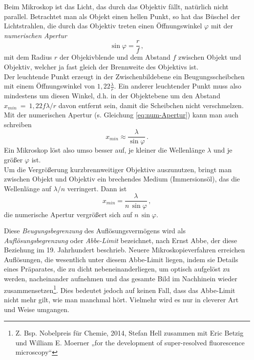 Beim Mikroskop ist das Licht, das durch das Objektiv fällt, natürlich nicht parallel. Betrachtet man als Objekt einen hellen Punkt, so hat das Büschel der Lichtstrahlen, die durch das Objektiv treten einen Öffnungswinkel $\varphi$ mit der \textit{numerischen Apertur}
\begin{equation} \label{eq:num-Apertur}
	\sin\varphi = \frac{r}{f}\, ,
\end{equation} 
mit dem Radius $r$ der Objekivblende und dem Abstand $f$ zwischen Objekt und Objektiv, welcher ja fast gleich der Brennweite des Objektivs ist.\\
Der leuchtende Punkt erzeugt in der Zwischenbildebene ein Beugungsscheibchen mit einem Öffnungswinkel von $1,22\frac{\lambda}{r}$. Ein anderer leuchtender Punkt muss also mindestens um diesen Winkel, d.h. in der Objektebene um den Abstand $x_{min}~=~1,22f\lambda/r$ davon entfernt sein, damit die Scheibchen nicht verschmelzen. Mit der numerischen Apertur (s. Gleichung \ref{eq:num-Apertur}) kann man auch schreiben
%
\begin{equation}
	x_{min} \approx \frac{\lambda}{\sin\varphi}\, .
\end{equation}
%
Ein Mikroskop löst also umso besser auf, je kleiner die Wellenlänge $\lambda$ und je größer $\varphi$ ist.\\
Um die Vergrößerung kurzbrennweitiger Objektive auszunutzen, bringt man zwischen Objekt und Objektiv ein brechendes Medium (Immersionsöl), das die Wellenlänge auf $\lambda/n$ verringert. Dann ist
%
\begin{equation}
	x_{min} = \frac{\lambda}{n\,\sin\varphi} \, ,
\end{equation}
%
die numerische Apertur vergrößert sich auf $n\,\sin\varphi$.

Diese \textit{Beugungsbegrenzung} des Auflösungsvermögens wird als \textit{Auflösungsbegrenzung} oder \textit{Abbe-Limit} bezeichnet, nach Ernst Abbe, der diese Beziehung im 19. Jahrhundert beschrieb. Neuere Mikroskopieverfahren erreichen Auflösungen, die wesentlich unter diesem Abbe-Limit liegen, indem sie Details eines Präparates, die zu dicht nebeneinanderliegen, um optisch aufgelöst zu werden, nacheinander aufnehmen und das gesamte Bild im Nachhinein wieder zusammensetzen\footnote{Z. Bsp. Nobelpreis für Chemie, 2014, Stefan Hell zusammen mit Eric Betzig und William E. Moerner „for the development of super-resolved fluorescence microscopy“}. Dies bedeutet jedoch auf keinen Fall, dass das Abbe-Limit nicht mehr gilt, wie man manchmal hört. Vielmehr wird es nur in cleverer Art und Weise umgangen.


